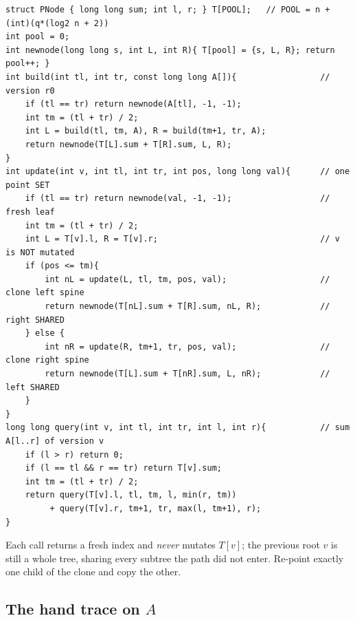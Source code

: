 \begin{lstlisting}[caption={persistent point-update, range-sum segment tree -- build, update, query, all from the node pool}, label={lst:c19-pseg}]
struct PNode { long long sum; int l, r; } T[POOL];   // POOL = n + (int)(q*(log2 n + 2))
int pool = 0;
int newnode(long long s, int L, int R){ T[pool] = {s, L, R}; return pool++; }
int build(int tl, int tr, const long long A[]){                 // version r0
    if (tl == tr) return newnode(A[tl], -1, -1);
    int tm = (tl + tr) / 2;
    int L = build(tl, tm, A), R = build(tm+1, tr, A);
    return newnode(T[L].sum + T[R].sum, L, R);
}
int update(int v, int tl, int tr, int pos, long long val){      // one point SET
    if (tl == tr) return newnode(val, -1, -1);                  // fresh leaf
    int tm = (tl + tr) / 2;
    int L = T[v].l, R = T[v].r;                                 // v is NOT mutated
    if (pos <= tm){
        int nL = update(L, tl, tm, pos, val);                   // clone left spine
        return newnode(T[nL].sum + T[R].sum, nL, R);            // right SHARED
    } else {
        int nR = update(R, tm+1, tr, pos, val);                 // clone right spine
        return newnode(T[L].sum + T[nR].sum, L, nR);            // left SHARED
    }
}
long long query(int v, int tl, int tr, int l, int r){           // sum A[l..r] of version v
    if (l > r) return 0;
    if (l == tl && r == tr) return T[v].sum;
    int tm = (tl + tr) / 2;
    return query(T[v].l, tl, tm, l, min(r, tm))
         + query(T[v].r, tm+1, tr, max(l, tm+1), r);
}
\end{lstlisting}

Each  call returns a fresh index and \emph{never} mutates \(T[v]\); the previous root \(v\) is still a whole tree, sharing every subtree the path did not enter.  Re-point exactly one child of the clone and copy the other.

\subsection{The hand trace on \(A\)}

